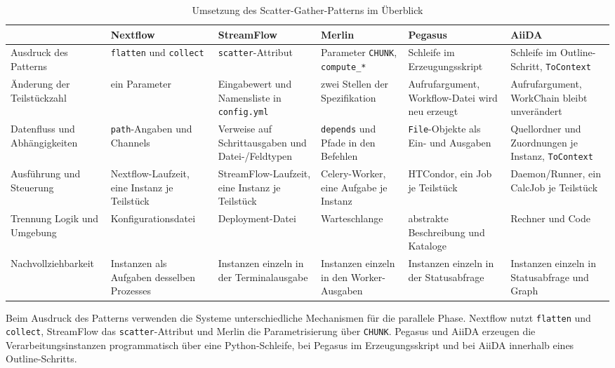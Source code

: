 \begin{table}[H]
  \caption{Umsetzung des Scatter-Gather-Patterns im Überblick}
  \label{tab:sg:vergleich}
  \centering
  \scriptsize
  \setlength{\tabcolsep}{3pt}
  \renewcommand{\arraystretch}{1.4}
  \begin{tabular}{>{\raggedright\arraybackslash}p{2.7cm} >{\raggedright\arraybackslash}p{1.9cm} >{\raggedright\arraybackslash}p{1.9cm} >{\raggedright\arraybackslash}p{1.9cm} >{\raggedright\arraybackslash}p{1.9cm} >{\raggedright\arraybackslash}p{1.9cm}}
    \hline
     & \textbf{Nextflow} & \textbf{Stream\-Flow} & \textbf{Merlin} & \textbf{Pegasus} & \textbf{AiiDA} \\
    \hline
    Ausdruck des Patterns & \texttt{flatten} und \texttt{collect} & \texttt{scatter}-Attribut & Parameter \texttt{CHUNK}, \texttt{compute\_*} & Schleife im Erzeugungs\-skript & Schleife im Outline-Schritt, \texttt{ToContext} \\
    Änderung der Teilstückzahl & ein Parameter & Eingabewert und Namensliste in \texttt{config.yml} & zwei Stellen der Spezifikation & Aufruf\-argument, Workflow-Datei wird neu erzeugt & Aufruf\-argument, WorkChain bleibt unverändert \\
    Datenfluss und Abhängigkeiten & \texttt{path}-Angaben und Channels & Verweise auf Schritt\-ausgaben und Datei-/Feldtypen & \texttt{depends} und Pfade in den Befehlen & \texttt{File}-Objekte als Ein- und Ausgaben & Quellordner und Zuordnungen je Instanz, \texttt{ToContext} \\
    Ausführung und Steuerung & Nextflow-Laufzeit, eine Instanz je Teilstück & StreamFlow-Laufzeit, eine Instanz je Teilstück & Celery-Worker, eine Aufgabe je Instanz & HTCondor, ein Job je Teilstück & Daemon/Runner, ein CalcJob je Teilstück \\
    Trennung Logik und Umgebung & Konfigurations\-datei & Deployment-Datei & Warteschlange & abstrakte Beschreibung und Kataloge & Rechner und Code \\
    Nachvollziehbarkeit & Instanzen als Aufgaben desselben Prozesses & Instanzen einzeln in der Terminal\-ausgabe & Instanzen einzeln in den Worker-Ausgaben & Instanzen einzeln in der Status\-abfrage & Instanzen einzeln in Status\-abfrage und Graph \\
    \hline
  \end{tabular}
\end{table}

Beim Ausdruck des Patterns verwenden die Systeme unterschiedliche
Mechanismen für die parallele Phase. Nextflow nutzt
\texttt{flatten} und \texttt{collect}, StreamFlow das
\texttt{scatter}-Attribut und Merlin die Parametrisierung über
\texttt{CHUNK}. Pegasus und AiiDA erzeugen die
Verarbeitungsinstanzen programmatisch über eine Python-Schleife,
bei Pegasus im Erzeugungsskript und bei AiiDA innerhalb eines
Outline-Schritts.

